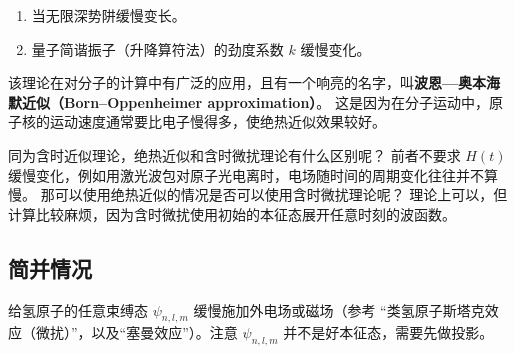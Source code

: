 \begin{example}{}
\begin{enumerate}
\item 当无限深势阱缓慢变长。
\item 量子简谐振子（升降算符法）的劲度系数 $k$ 缓慢变化。
\end{enumerate}
\end{example}

该理论在对分子的计算中有广泛的应用，且有一个响亮的名字，叫\textbf{波恩—奥本海默近似（Born–Oppenheimer approximation）}。 这是因为在分子运动中，原子核的运动速度通常要比电子慢得多，使绝热近似效果较好。

同为含时近似理论，绝热近似和含时微扰理论有什么区别呢？ 前者不要求 $H(t)$ 缓慢变化，例如用激光波包对原子光电离时，电场随时间的周期变化往往并不算慢。 那可以使用绝热近似的情况是否可以使用含时微扰理论呢？ 理论上可以，但计算比较麻烦，因为含时微扰使用初始的本征态展开任意时刻的波函数。

\subsection{简并情况}

\begin{example}{}
给氢原子的任意束缚态 $\psi_{n,l,m}$ 缓慢施加外电场或磁场（参考 “类氢原子斯塔克效应（微扰）”，以及“塞曼效应”）。注意 $\psi_{n,l,m}$ 并不是好本征态，需要先做投影。
\end{example}

